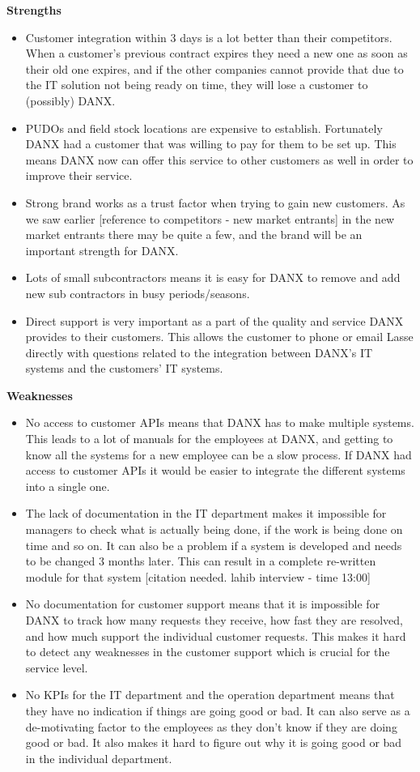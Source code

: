 \textbf{Strengths}
\begin{itemize}
\item Customer integration within 3 days is a lot better than their competitors. When a customer’s previous contract expires they need a new one as soon as their old one expires, and if the other companies cannot provide that due to the IT solution not being ready on time, they will lose a customer to (possibly) DANX.
\item PUDOs and field stock locations are expensive to establish. Fortunately DANX had a customer that was willing to pay for them to be set up. This means DANX now can offer this service to other customers as well in order to improve their service.
\item Strong brand works as a trust factor when trying to gain new customers. As we saw earlier [reference to competitors - new market entrants] in the new market entrants there may be quite a few, and the brand will be an important strength for DANX.
\item Lots of small subcontractors means it is easy for DANX to remove and add new sub contractors in busy periods/seasons. 
\item Direct support is very important as a part of the quality and service DANX provides to their customers. This allows the customer to phone or email Lasse directly with questions related to the integration between DANX’s IT systems and the customers’ IT systems.
\end{itemize}

\textbf{Weaknesses}
\begin{itemize}
\item No access to customer APIs means that DANX has to make multiple systems. This leads to a lot of manuals for the employees at DANX, and getting to know all the systems for a new employee can be a slow process. If DANX had access to customer APIs it would be easier to integrate the different systems into a single one.
\item The lack of documentation in the IT department makes it impossible for managers to check what is actually being done, if the work is being done on time and so on.
It can also be a problem if a system is developed and needs to be changed 3 months later. This can result in a complete re-written module for that system [citation needed. lahib interview - time 13:00]
\item No documentation for customer support means that it is impossible for DANX to track how many requests they receive, how fast they are resolved, and how much support the individual customer requests.
This makes it hard to detect any weaknesses in the customer support which is crucial for the service level.
\item No KPIs for the IT department and the operation department means that they have no indication if things are going good or bad. It can also serve as a de-motivating factor to the employees as they don’t know if they are doing good or bad. It also makes it hard to figure out why it is going good or bad in the individual department.
\end{itemize}

